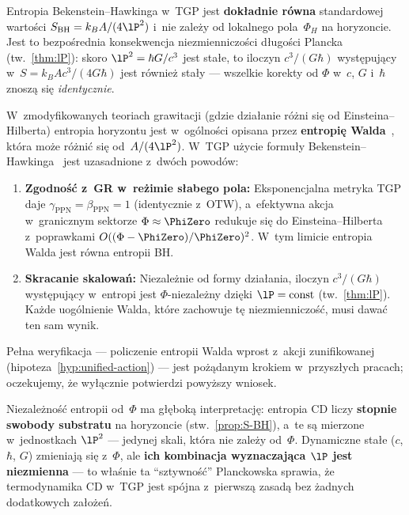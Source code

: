\begin{corollary}\label{cor:S-Phi-independent}
Entropia Bekenstein--Hawkinga w~TGP jest
\textbf{dok\l{}adnie r\'owna} standardowej warto\'sci
$S_{\mathrm{BH}} = k_B A/(4\lP^2)$ i~nie zale\.zy od
lokalnego pola~$\Phi_H$ na horyzoncie.
Jest to bezpo\'srednia konsekwencja niezmienniczo\'sci
d\l{}ugo\'sci Plancka (tw.~\ref{thm:lP}): skoro
$\lP^2 = \hbar G/c^3$ jest sta\l{}e, to iloczyn
$c^3/(G\hbar)$ wyst\k{e}puj\k{a}cy w~$S = k_B Ac^3/(4G\hbar)$
jest r\'ownie\.z sta\l{}y --- wszelkie korekty od $\Phi$
w~$c$, $G$ i~$\hbar$ znosz\k{a} si\k{e} \emph{identycznie}.
\end{corollary}

\begin{remark}\label{rem:wald-entropy}
W~zmodyfikowanych teoriach grawitacji (gdzie dzia\l{}anie r\'o\.zni
si\k{e} od Einsteina--Hilberta) entropia horyzontu jest w~og\'olno\'sci
opisana przez \textbf{entropi\k{e} Walda}~\cite{Wald1993}, kt\'ora mo\.ze r\'o\.zni\'c
si\k{e} od~$A/(4\lP^2)$. W~TGP u\.zycie formu\l{}y
Bekenstein--Hawkinga~\cite{Bekenstein1973,Hawking1975} jest uzasadnione z~dw\'och powod\'ow:
\begin{enumerate}[nosep]
  \item \textbf{Zgodno\'s\'c z~GR w~re\.zimie s\l{}abego pola:}
    Eksponencjalna metryka TGP daje $\gamma_{\mathrm{PPN}}=\beta_{\mathrm{PPN}}=1$
    (identycznie z~OTW), a~efektywna akcja w~granicznym sektorze
    $\Phi\approx\PhiZero$ redukuje si\k{e} do Einsteina--Hilberta
    z~poprawkami $O((\Phi-\PhiZero)/\PhiZero)^2$.
    W~tym limicie entropia Walda jest r\'owna entropii BH.
  \item \textbf{Skracanie skalowa\'n:}
    Niezale\.znie od formy dzia\l{}ania, iloczyn $c^3/(G\hbar)$
    wyst\k{e}puj\k{a}cy w~entropi jest $\Phi$-niezale\.zny
    dzi\k{e}ki $\lP=\mathrm{const}$ (tw.~\ref{thm:lP}).
    Ka\.zde uog\'olnienie Walda, kt\'ore zachowuje t\k{e}
    niezmienniczo\'s\'c, musi dawa\'c ten sam wynik.
\end{enumerate}
Pe\l{}na weryfikacja --- policzenie entropii Walda wprost
z~akcji zunifikowanej (hipoteza~\ref{hyp:unified-action}) ---
jest po\.z\k{a}danym krokiem w~przysz\l{}ych pracach; oczekujemy,
\.ze wy\l{}\k{a}cznie potwierdzi powy\.zszy wniosek.
\end{remark}

\begin{remark}
Niezale\.zno\'s\'c entropii od~$\Phi$ ma g\l{}\k{e}bok\k{a}
interpretacj\k{e}: entropia CD liczy \textbf{stopnie swobody
substratu} na horyzoncie (stw.~\ref{prop:S-BH}), a~te s\k{a}
mierzone w~jednostkach $\lP^2$ --- jedynej skali, kt\'ora
nie zale\.zy od~$\Phi$. Dynamiczne sta\l{}e ($c$, $\hbar$, $G$)
zmieniaj\k{a} si\k{e} z~$\Phi$, ale \textbf{ich kombinacja
wyznaczaj\k{a}ca $\lP$ jest niezmienna} --- to w\l{}a\'snie
ta ``sztywno\'s\'c'' Planckowska sprawia, \.ze termodynamika CD
w~TGP jest sp\'ojna z~pierwsz\k{a} zasad\k{a} bez \.zadnych
dodatkowych za\l{}o\.ze\'n.
\end{remark}

